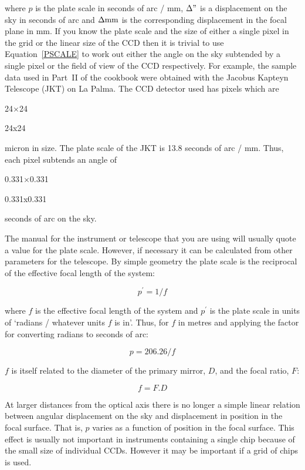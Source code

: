 \documentclass[twoside,11pt]{article}
\begin{document}
where $p$ is the plate scale in seconds of arc / mm, $\Delta "$ is a
displacement on the sky in seconds of arc and $\Delta {\rm mm}$ is the
corresponding displacement in the focal plane in mm.  If you know the plate
scale and the size of either a single pixel in the grid or the linear size
of the CCD then it is trivial to use Equation~\ref{PSCALE} to work out
either the angle on the sky subtended by a single pixel or the field of
view of the CCD respectively.  For example, the sample data used in Part~II
of the cookbook were obtained with the Jacobus Kapteyn Telescope (JKT) on
La Palma.  The CCD detector used has pixels which are 
\begin{latex} 
24$\times$24 
\end{latex}
\begin{htmlonly} 
24x24 
\end{htmlonly}
micron in size.
The plate scale of the JKT is 13.8 seconds of arc / mm.  Thus, each
pixel subtends an angle of 
\begin{latex} 
0.331$\times$0.331 
\end{latex}
\begin{htmlonly} 
0.331x0.331 
\end{htmlonly}
seconds of arc on the sky.

The manual for the instrument or telescope that you are using will usually
quote a value for the plate scale.  However, if necessary it can be
calculated from other parameters for the telescope.  By simple geometry
the plate scale is the reciprocal of the effective focal length of the
system:

\begin{equation}
p^{\prime} = 1 / f
\end{equation}

where $f$ is the effective focal length of the system and $p^{\prime}$ is the
plate scale in units of `radians / whatever units $f$ is in'.  Thus, for
$f$ in metres and applying the factor for converting radians to seconds
of arc:

\begin{equation}
p = 206.26 / f
\end{equation}

$f$ is itself related to the diameter of the primary mirror, $D$, and
the focal ratio, $F$:

\begin{equation}
f = F . D
\end{equation}

At larger distances from the optical axis there is no longer a simple
linear relation between angular displacement on the sky and displacement
in position in the focal surface.  That is, $p$ varies as a function of
position in the focal surface.  This effect is usually not important
in instruments containing a single chip because of the small size of
individual CCDs.  However it may be important if a grid of chips is used.
\end{document}
